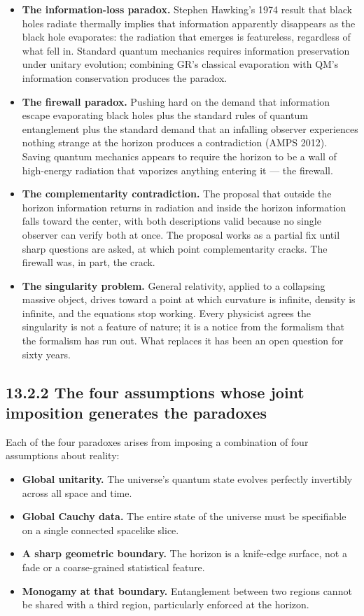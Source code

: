 \documentclass[11pt]{book}
\begin{document}
\begin{itemize}
\item \textbf{The information-loss paradox.} Stephen Hawking's 1974 result that black holes radiate thermally implies that information apparently disappears as the black hole evaporates: the radiation that emerges is featureless, regardless of what fell in. Standard quantum mechanics requires information preservation under unitary evolution; combining GR's classical evaporation with QM's information conservation produces the paradox.
\item \textbf{The firewall paradox.} Pushing hard on the demand that information escape evaporating black holes plus the standard rules of quantum entanglement plus the standard demand that an infalling observer experiences nothing strange at the horizon produces a contradiction (AMPS 2012). Saving quantum mechanics appears to require the horizon to be a wall of high-energy radiation that vaporizes anything entering it — the firewall.
\item \textbf{The complementarity contradiction.} The proposal that outside the horizon information returns in radiation and inside the horizon information falls toward the center, with both descriptions valid because no single observer can verify both at once. The proposal works as a partial fix until sharp questions are asked, at which point complementarity cracks. The firewall was, in part, the crack.
\item \textbf{The singularity problem.} General relativity, applied to a collapsing massive object, drives toward a point at which curvature is infinite, density is infinite, and the equations stop working. Every physicist agrees the singularity is not a feature of nature; it is a notice from the formalism that the formalism has run out. What replaces it has been an open question for sixty years.
\end{itemize}

\subsection{13.2.2 The four assumptions whose joint imposition generates the paradoxes}

Each of the four paradoxes arises from imposing a combination of four assumptions about reality:

\begin{itemize}
\item \textbf{Global unitarity.} The universe's quantum state evolves perfectly invertibly across all space and time.
\item \textbf{Global Cauchy data.} The entire state of the universe must be specifiable on a single connected spacelike slice.
\item \textbf{A sharp geometric boundary.} The horizon is a knife-edge surface, not a fade or a coarse-grained statistical feature.
\item \textbf{Monogamy at that boundary.} Entanglement between two regions cannot be shared with a third region, particularly enforced at the horizon.
\end{itemize}
\end{document}
